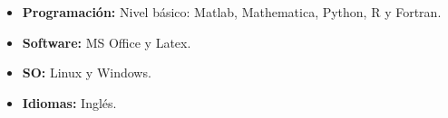 \documentclass[11pt,a4paper,sans]{moderncv}      %
\begin{document}
\begin{itemize}

\item \textbf{Programaci\'on:} Nivel b\'asico: Matlab,
Mathematica, Python, R y Fortran.

\vspace{6pt}

\item \textbf{Software:} MS Office y Latex.

\vspace{6pt}

\item \textbf{SO:} Linux y Windows.

\vspace{6pt}

\item \textbf{Idiomas:} Ingl\'es.

\end{itemize}


\nocite{*}



\end{document}
